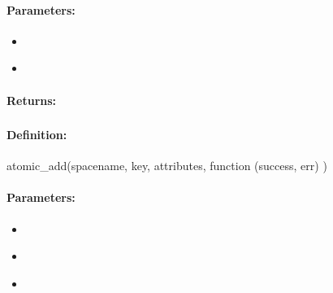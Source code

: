 \paragraph{Parameters:}
\begin{itemize}[noitemsep]
\item {}\\

\item {}\\

\end{itemize}

\paragraph{Returns:}


\pagebreak
\subsubsection{}
\label{api:nodejs:atomic_add}


\paragraph{Definition:}
\begin{javascriptcode}
atomic_add(spacename, key, attributes, function (success, err) {})
\end{javascriptcode}
\paragraph{Parameters:}
\begin{itemize}[noitemsep]
\item {}\\

\item {}\\

\item {}\\

\end{itemize}

